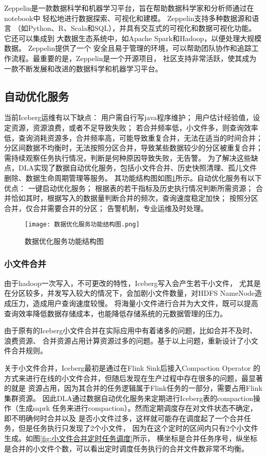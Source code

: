 Zeppelin是一款数据科学和机器学习平台，旨在帮助数据科学家和分析师通过在notebook中
轻松地进行数据探索、可视化和建模。 Zeppelin支持多种数据源和语言
（如Python、R、Scala和SQL），并具有交互式的可视化和数据可视化功能。它还可以集成到
大数据生态系统中，如Apache Spark和Hadoop，以便处理大规模数据。 Zeppelin提供了一个
安全且易于管理的环境，可以帮助团队协作和追踪工作流程。最重要的是，Zeppelin是一个开源项目，
社区支持非常活跃，使其成为一款不断发展和改进的数据科学和机器学习平台\cite{34}。

\subsection{自动优化服务}

当前Iceberg运维有以下缺点：
用户需自行写java程序维护；
用户估计经验值，设定资源，资源浪费，或者不足导致失败；
若合并频率低，小文件多，则查询效率低，查询消耗资源多，合并频率高，可能导致重复合并，无法在适当的时间合并；
分区间数据不均衡时，无法按照分区合并，导致某些数据较少的分区被重复合并；
需持续观察任务执行情况，判断是何种原因导致失败，无告警。
为了解决这些缺点，DLA实现了数据自动优化服务，包括小文件合并、历史快照清理、孤儿文件删除、数据生命周期管理等服务。
其功能结构图如图\ref{fig:数据优化服务功能结构图}所示。自动优化服务有以下优点：
一键启动优化服务；
根据表的若干指标及历史执行情况判断所需资源；
合并恰如其时，根据写入的数据量判断合并的频次，查询速度稳定加快；
按照分区合并，仅合并需要合并的分区；
告警机制，专业运维及时处理。

\begin{figure}[H]
  \centering
  \texttt{[image: 数据优化服务功能结构图.png]}
  \caption{数据优化服务功能结构图}
  \label{fig:数据优化服务功能结构图}
\end{figure}

\subsubsection{小文件合并}

由于hadoop一次写入，不可更改的特性，Iceberg写入会产生若干小文件，
尤其是在分区较多，并发写入较大的情况下，会加剧小文件数量，对HDFS NameNode造成压力，造成用户查询速度较慢\cite{35}。
将海量⼩⽂件进⾏合并为⼤⽂件，既可以提高查询效率降低数据存储成本，也能降低存储系统的元数据管理的压力。

由于原有的Iceberg小文件合并在实际应用中有着诸多的问题，比如合并不及时、浪费资源、
合并资源占用计算资源过多的问题。基于以上问题，重新设计了小文件合并规则。

关于小文件合并，Iceberg最初是通过在Flink Sink后接入Compaction Operator
的方式来进行在线的小文件合并，但随后发现在生产过程中存在很多的问题，最显著的就是
资源占用，因为其合并的任务逻辑属于Flink任务的一部分，需要占用Flink集群资源。
因此DLA通过数据自动优化服务来定期进行Iceberg表的compaction操作（生成saprk
任务来进行compaction）。然而定期调度存在对文件状态不确定，即不明确何时合并以及
是否小文件过多，这样就可能存在调度起了一个合并任务，但是任务执行只发现了2个小文件，
因为在这个定时的区间内只有2个小文件生成。如图\ref{fig:小文件合并定时任务调度}所示，
横坐标是合并任务序号，纵坐标是合并的小文件个数，可以看出定时调度任务执行的合并文件数非常不均衡。

